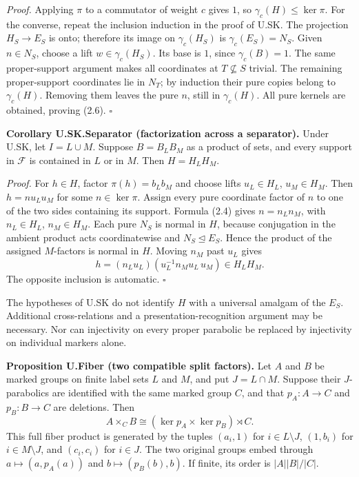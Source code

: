 \documentclass[
  11pt,
  a4paper,
]{article}
\begin{document}
\emph{Proof.} Applying \(\pi\) to a commutator of weight \(c\) gives
\(1\), so \(\gamma_c(H)\leq\ker\pi\). For the converse, repeat the
inclusion induction in the proof of U.SK. The projection \(H_S\to E_S\)
is onto; therefore its image on \(\gamma_c(H_S)\) is
\(\gamma_c(E_S)=N_S\). Given \(n\in N_S\), choose a lift
\(w\in\gamma_c(H_S)\). Its base is \(1\), since \(\gamma_c(B)=1\). The
same proper-support argument makes all coordinates at
\(T\not\subseteq S\) trivial. The remaining proper-support coordinates
lie in \(N_T\); by induction their pure copies belong to
\(\gamma_c(H)\). Removing them leaves the pure \(n\), still in
\(\gamma_c(H)\). All pure kernels are obtained, proving (2.6).
\(\square\)

\textbf{Corollary U.SK.Separator (factorization across a separator).}
Under U.SK, let \(I=L\cup M\). Suppose \(B=B_LB_M\) as a product of
sets, and every support in \(\mathcal F\) is contained in \(L\) or in
\(M\). Then \(H=H_LH_M\).

\emph{Proof.} For \(h\in H\), factor \(\pi(h)=b_Lb_M\) and choose lifts
\(u_L\in H_L\), \(u_M\in H_M\). Then \(h=n u_Lu_M\) for some
\(n\in\ker\pi\). Assign every pure coordinate factor of \(n\) to one of
the two sides containing its support. Formula (2.4) gives \(n=n_Ln_M\),
with \(n_L\in H_L\), \(n_M\in H_M\). Each pure \(N_S\) is normal in
\(H\), because conjugation in the ambient product acts coordinatewise
and \(N_S\unlhd E_S\). Hence the product of the assigned \(M\)-factors
is normal in \(H\). Moving \(n_M\) past \(u_L\) gives \[
h=(n_Lu_L)(u_L^{-1}n_Mu_L\,u_M)\in H_LH_M.
\] The opposite inclusion is automatic. \(\square\)

The hypotheses of U.SK do not identify \(H\) with a universal amalgam of
the \(E_S\). Additional cross-relations and a presentation-recognition
argument may be necessary. Nor can injectivity on every proper parabolic
be replaced by injectivity on individual markers alone.

\textbf{Proposition U.Fiber (two compatible split factors).} Let \(A\)
and \(B\) be marked groups on finite label sets \(L\) and \(M\), and put
\(J=L\cap M\). Suppose their \(J\)-parabolics are identified with the
same marked group \(C\), and that \(p_A:A\to C\) and \(p_B:B\to C\) are
deletions. Then \[
A\times_C B\cong(\ker p_A\times\ker p_B)\rtimes C.
\tag{2.7}
\] This full fiber product is generated by the tuples \((a_i,1)\) for
\(i\in L\setminus J\), \((1,b_i)\) for \(i\in M\setminus J\), and
\((c_i,c_i)\) for \(i\in J\). The two original groups embed through
\(a\mapsto(a,p_A(a))\) and \(b\mapsto(p_B(b),b)\). If finite, its order
is \(|A||B|/|C|\).
\end{document}
